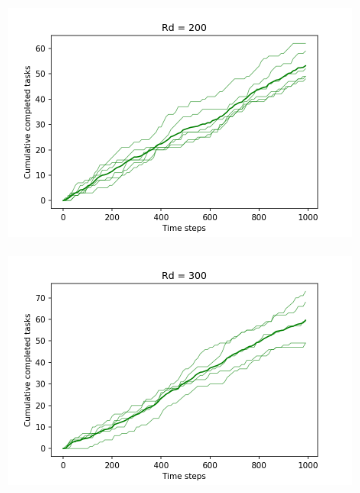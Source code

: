 \documentclass[11pt]{article}
\begin{document}
\begin{figure}[ht]
    \begin{subfigure}{.5\textwidth}
      \centering
      \includegraphics[width=\linewidth]{figures/Rd_200.png}
    \end{subfigure}
    \begin{subfigure}{.5\textwidth}
      \centering
      \includegraphics[width=\linewidth]{figures/Rd_300.png}
    \end{subfigure}
\end{figure}
\end{document}
